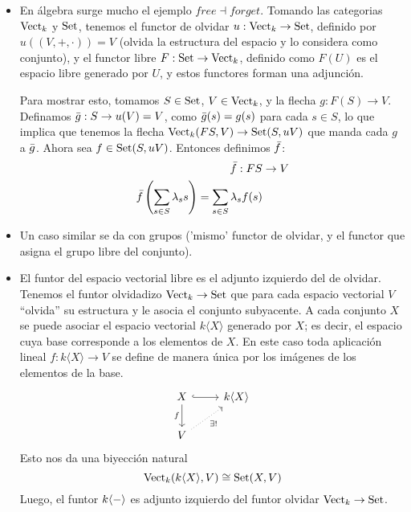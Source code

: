 \begin{exa}
\begin{itemize}
    \item En álgebra surge mucho el ejemplo $free\dashv forget$. Tomando las categorias $\mathrm{Vect}_k$ y $\mathrm{Set}$, tenemos el functor de olvidar $u:\mathrm{Vect}_k\to\mathrm{Set}$, definido por $u((V,+,\cdot))= V$ (olvida la estructura del espacio y lo considera como conjunto), y el functor libre $F:\mathrm{Set}\to\mathrm{Vect}_k$, definido como $F(U)$ es el espacio libre generado por $U$, y estos functores forman una adjunción.
    
    Para mostrar esto, tomamos $S\in\mathrm{Set}$, $V\in\mathrm{Vect}_k$, y la flecha $g:F(S)\to V$.
    Definamos $\Bar{g}:S\to u(V)=V$, como $\Bar{g}(s)=g(s)$ para cada $s\in S$, lo que implica que tenemos la flecha $\mathrm{Vect}_k(FS,V)\to\mathrm{Set}(S,uV)$ que manda cada $g$ a $\Bar{g}$.
    Ahora sea $f\in\mathrm{Set}(S,uV)$. Entonces definimos $\Bar{f}$:
    \begin{align*}
        \Bar{f}:FS & \to V \\
        \Bar{f}\left(\sum_{s\in S}\lambda_ss\right)=\sum_{s\in S}\lambda_s f(s)
    \end{align*}
    \item Un caso similar se da con grupos ('mismo' functor de olvidar, y el functor que asigna el grupo libre del conjunto).
    \item El funtor del espacio vectorial libre es el
      adjunto izquierdo del de olvidar.
      Tenemos el funtor olvidadizo $\mathrm{Vect}_k\to\mathrm{Set}$ que para cada
      espacio vectorial $V$ “olvida” su estructura y le asocia el
      conjunto subyacente. A cada conjunto $X$ se puede asociar
      el espacio vectorial $k\langle X\rangle$ generado por $X$;
      es decir, el espacio cuya base corresponde a los elementos
      de $X$. En este caso toda aplicación lineal $f:k\langle
      X\rangle\to V$ se define de manera única por los imágenes
      de los elementos de la base.
      \[\begin{tikzcd}
    	{X} & {k\langle X\rangle} \\
    	{V}
    	\arrow["{f}"', from=1-1, to=2-1]
    	\arrow[from=1-1, to=1-2, hook]
    	\arrow["{\exists !}"', from=2-1, to=1-2, dotted]
    \end{tikzcd}\]
    Esto nos da una biyección natural
    $$\mathrm{Vect}_k(k\langle X\rangle, V)
    \cong
    \mathrm{Set}(X,V)$$
    Luego, el funtor $k\langle-\rangle$ es adjunto izquierdo del
    funtor olvidar $\mathrm{Vect}_k\to\mathrm{Set}$.
    

\end{itemize}
\end{exa}
